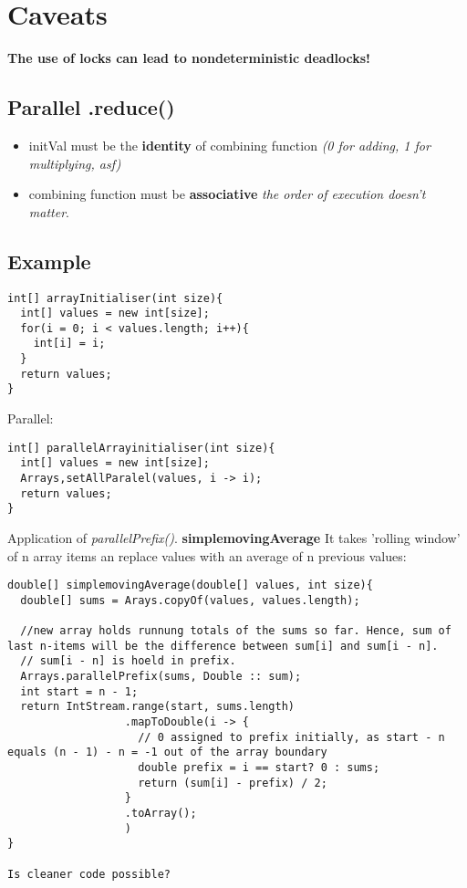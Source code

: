 \documentclass{report}
\begin{document}
\section{Caveats}
\textbf{The use of locks can lead to nondeterministic deadlocks!}

\subsection{Parallel .reduce()}
\begin{itemize}
	\item initVal must be the \textbf{identity} of combining function \textit{(0 for adding, 1 for multiplying, asf)}
	\item combining function must be \textbf{associative} \textit{the order of execution doesn't matter}.
\end{itemize}

\subsection*{Example}
\begin{verbatim}
int[] arrayInitialiser(int size){
  int[] values = new int[size];
  for(i = 0; i < values.length; i++){
    int[i] = i;
  }
  return values;
}
\end{verbatim}
Parallel:
\begin{verbatim}
int[] parallelArrayinitialiser(int size){
  int[] values = new int[size];
  Arrays,setAllParalel(values, i -> i);
  return values;
}
\end{verbatim}

Application of \textit{parallelPrefix()}. \textbf{simplemovingAverage} It takes 'rolling window' of n array items an replace values with an average of n previous values:
\begin{verbatim}
double[] simplemovingAverage(double[] values, int size){
  double[] sums = Arays.copyOf(values, values.length);
  
  //new array holds runnung totals of the sums so far. Hence, sum of last n-items will be the difference between sum[i] and sum[i - n].
  // sum[i - n] is hoeld in prefix. 
  Arrays.parallelPrefix(sums, Double :: sum);
  int start = n - 1;
  return IntStream.range(start, sums.length)
                  .mapToDouble(i -> {
                    // 0 assigned to prefix initially, as start - n equals (n - 1) - n = -1 out of the array boundary
                    double prefix = i == start? 0 : sums;
                    return (sum[i] - prefix) / 2;
                  }
                  .toArray();
                  )
}

Is cleaner code possible?
\end{verbatim}
\end{document}
